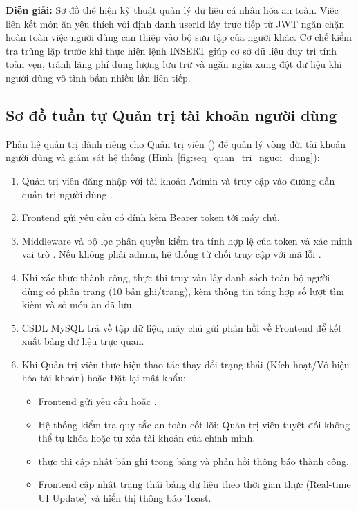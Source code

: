 \noindent\textbf{Diễn giải:} Sơ đồ thể hiện kỹ thuật quản lý dữ liệu cá nhân hóa an toàn. Việc liên kết món ăn yêu thích với định danh userId lấy trực tiếp từ JWT ngăn chặn hoàn toàn việc người dùng can thiệp vào bộ sưu tập của người khác. Cơ chế kiểm tra trùng lặp trước khi thực hiện lệnh INSERT giúp cơ sở dữ liệu duy trì tính toàn vẹn, tránh lãng phí dung lượng lưu trữ và ngăn ngừa xung đột dữ liệu khi người dùng vô tình bấm nhiều lần liên tiếp.

\subsection{Sơ đồ tuần tự Quản trị tài khoản người dùng}

Phân hệ quản trị dành riêng cho Quản trị viên () để quản lý vòng đời tài khoản người dùng và giám sát hệ thống (Hình~\ref{fig:seq_quan_tri_nguoi_dung}):
\begin{enumerate}[leftmargin=1.6em, itemsep=2pt]
  \item Quản trị viên đăng nhập với tài khoản Admin và truy cập vào đường dẫn quản trị người dùng .
  \item Frontend gửi yêu cầu  có đính kèm Bearer token tới máy chủ.
  \item Middleware  và bộ lọc phân quyền  kiểm tra tính hợp lệ của token và xác minh vai trò . Nếu không phải admin, hệ thống từ chối truy cập với mã lỗi .
  \item Khi xác thực thành công,  thực thi truy vấn lấy danh sách toàn bộ người dùng có phân trang (10 bản ghi/trang), kèm thông tin tổng hợp số lượt tìm kiếm và số món ăn đã lưu.
  \item CSDL MySQL trả về tập dữ liệu, máy chủ gửi phản hồi  về Frontend để kết xuất bảng dữ liệu trực quan.
  \item Khi Quản trị viên thực hiện thao tác thay đổi trạng thái (Kích hoạt/Vô hiệu hóa tài khoản) hoặc Đặt lại mật khẩu:
  \begin{itemize}
    \item Frontend gửi yêu cầu  hoặc .
    \item Hệ thống kiểm tra quy tắc an toàn cốt lõi: Quản trị viên tuyệt đối không thể tự khóa hoặc tự xóa tài khoản của chính mình.
    \item {} thực thi cập nhật bản ghi trong bảng  và phản hồi thông báo thành công.
    \item Frontend cập nhật trạng thái bảng dữ liệu theo thời gian thực (Real-time UI Update) và hiển thị thông báo Toast.
  \end{itemize}
\end{enumerate}

